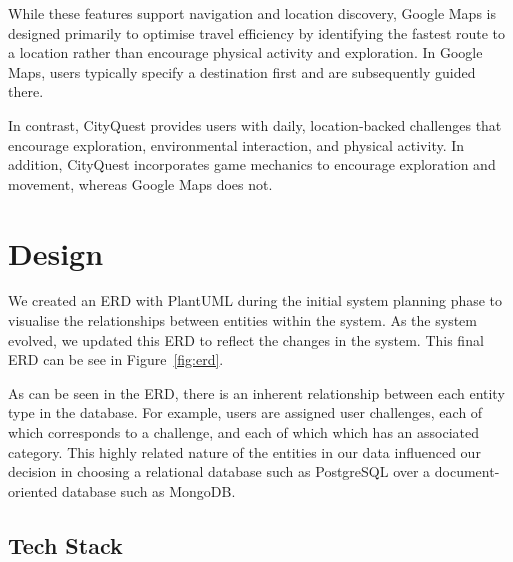 \documentclass{vgtc}                          %
\begin{document}
While these features support navigation and location discovery, Google Maps is designed primarily to optimise travel efficiency by identifying the fastest route to a location rather than encourage physical activity and exploration. In Google Maps, users typically specify a destination first and are subsequently guided there.

In contrast, CityQuest provides users with daily, location-backed challenges that encourage exploration, environmental interaction, and physical activity. In addition, CityQuest incorporates game mechanics to encourage exploration and movement, whereas Google Maps does not.

\section{Design}

We created an ERD with PlantUML during the initial system planning phase to visualise the relationships between entities within the system. As the system evolved, we updated this ERD to reflect the changes in the system. This final ERD can be see in Figure~\ref{fig:erd}.

As can be seen in the ERD, there is an inherent relationship between each entity type in the database. For example, users are assigned user challenges, each of which corresponds to a challenge, and each of which which has an associated category. This highly related nature of the entities in our data influenced our decision in choosing a relational database such as PostgreSQL over a document-oriented database such as MongoDB.

\subsection{Tech Stack}
\end{document}
